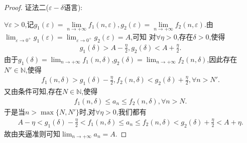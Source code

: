 \documentclass[../../main.tex]{subfiles}%
\begin{document}
\begin{proof}
{\color{blue}证法二($\varepsilon-\delta$语言):}

$\forall \varepsilon>0$,记$g_1\left( \varepsilon \right) =\underset{n\rightarrow +\infty}{\lim}f_1(n,\varepsilon ),g_2\left( \varepsilon \right) =\underset{n\rightarrow +\infty}{\lim}f_2(n,\varepsilon ).$由\(\lim_{\varepsilon \to 0^+}g_1(\varepsilon)=\lim_{\varepsilon \to 0^+}g_2(\varepsilon)=A\),可知
对\(\forall \eta > 0\),存在\(\delta > 0\),使得
\begin{align*}
g_1(\delta) > A - \frac{\eta}{2},g_2(\delta) < A + \frac{\eta}{2}.
\end{align*}
由于\(g_1(\delta)=\lim_{n \to +\infty}f_1(n,\delta)\),\(g_2(\delta)=\lim_{n \to +\infty}f_2(n,\delta)\),因此存在\(N'\in \mathbb{N}\),使得
\begin{align*}
f_1(n,\delta) > g_1(\delta) - \frac{\eta}{2},f_2(n,\delta) < g_2(\delta) + \frac{\eta}{2},\forall n > N'.
\end{align*}
又由条件可知,存在\(N\in \mathbb{N}\),使得
\begin{align*}
f_1(n,\delta) \leqslant a_n \leqslant f_2(n,\delta),\forall n > N .
\end{align*}
于是当\(n > \max\{N,N'\}\)时,对\(\forall \eta > 0\),我们都有
\begin{align*}
A - \eta < g_1(\delta) - \frac{\eta}{2} < f_1(n,\delta) \leqslant a_n \leqslant f_2(n,\delta) < g_2(\delta) + \frac{\eta}{2} < A + \eta.
\end{align*}
故由夹逼准则可知\(\lim_{n \to +\infty}a_n = A\). 

\end{proof}
\end{document}
